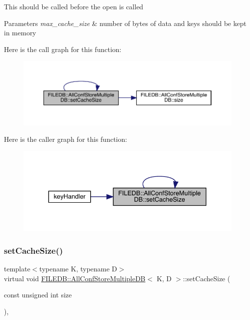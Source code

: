 This should be called before the open is called 
\begin{DoxyParams}{Parameters}
{\em max\+\_\+cache\+\_\+size} & number of bytes of data and keys should be kept in memory \\
\hline
\end{DoxyParams}
Here is the call graph for this function\+:
\nopagebreak
\begin{figure}[H]
\begin{center}
\leavevmode
\includegraphics[width=350pt]{d5/dbe/classFILEDB_1_1AllConfStoreMultipleDB_a746ef51b2dedf529a8e85528c0d31bfc_cgraph}
\end{center}
\end{figure}
Here is the caller graph for this function\+:
\nopagebreak
\begin{figure}[H]
\begin{center}
\leavevmode
\includegraphics[width=330pt]{d5/dbe/classFILEDB_1_1AllConfStoreMultipleDB_a746ef51b2dedf529a8e85528c0d31bfc_icgraph}
\end{center}
\end{figure}
\mbox{\label{classFILEDB_1_1AllConfStoreMultipleDB_a746ef51b2dedf529a8e85528c0d31bfc}} 
\subsubsection{\texorpdfstring{setCacheSize()}{setCacheSize()}\hspace{0.1cm}{\footnotesize\ttfamily [3/3]}}
{\footnotesize\ttfamily template$<$typename K, typename D$>$ \\
virtual void \mbox{\hyperlink{classFILEDB_1_1AllConfStoreMultipleDB}{F\+I\+L\+E\+D\+B\+::\+All\+Conf\+Store\+Multiple\+DB}}$<$ K, D $>$\+::set\+Cache\+Size (\begin{DoxyParamCaption}\item[{const unsigned int}]{size }\end{DoxyParamCaption})\hspace{0.3cm}{\ttfamily [inline]}, {\ttfamily [virtual]}}

